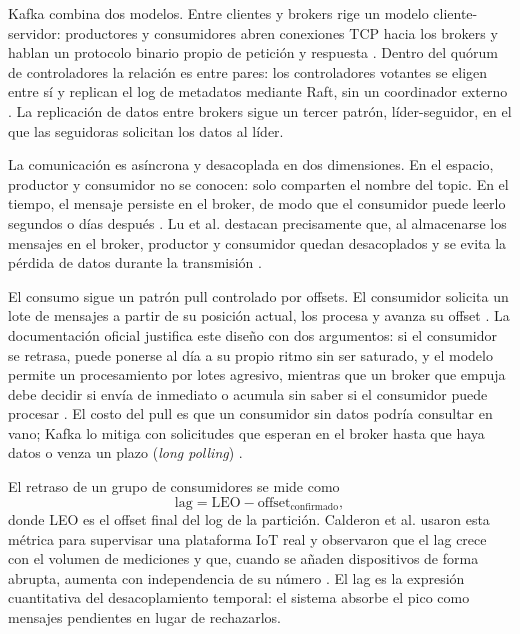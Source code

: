 \documentclass[11pt,a4paper]{article}
\begin{document}
Kafka combina dos modelos. Entre clientes y brokers rige un modelo cliente-servidor: productores y consumidores abren conexiones TCP hacia los brokers y hablan un protocolo binario propio de petición y respuesta \cite{calderon2024monitoring,kafkadocs}. Dentro del quórum de controladores la relación es entre pares: los controladores votantes se eligen entre sí y replican el log de metadatos mediante Raft, sin un coordinador externo \cite{kip500,ongaro2014raft}. La replicación de datos entre brokers sigue un tercer patrón, líder-seguidor, en el que las seguidoras solicitan los datos al líder.

La comunicación es asíncrona y desacoplada en dos dimensiones. En el espacio, productor y consumidor no se conocen: solo comparten el nombre del topic. En el tiempo, el mensaje persiste en el broker, de modo que el consumidor puede leerlo segundos o días después \cite{lu2025proposal}. Lu et al. destacan precisamente que, al almacenarse los mensajes en el broker, productor y consumidor quedan desacoplados y se evita la pérdida de datos durante la transmisión \cite{lu2025proposal}.

El consumo sigue un patrón pull controlado por offsets. El consumidor solicita un lote de mensajes a partir de su posición actual, los procesa y avanza su offset \cite{raptis2023survey}. La documentación oficial justifica este diseño con dos argumentos: si el consumidor se retrasa, puede ponerse al día a su propio ritmo sin ser saturado, y el modelo permite un procesamiento por lotes agresivo, mientras que un broker que empuja debe decidir si envía de inmediato o acumula sin saber si el consumidor puede procesar \cite{kafkadocs}. El costo del pull es que un consumidor sin datos podría consultar en vano; Kafka lo mitiga con solicitudes que esperan en el broker hasta que haya datos o venza un plazo (\emph{long polling}) \cite{kafkadocs}.

El retraso de un grupo de consumidores se mide como
\begin{equation}
\text{lag} = \text{LEO} - \text{offset}_{\text{confirmado}},
\end{equation}
donde LEO es el offset final del log de la partición. Calderon et al. usaron esta métrica para supervisar una plataforma IoT real y observaron que el lag crece con el volumen de mediciones y que, cuando se añaden dispositivos de forma abrupta, aumenta con independencia de su número \cite{calderon2024monitoring}. El lag es la expresión cuantitativa del desacoplamiento temporal: el sistema absorbe el pico como mensajes pendientes en lugar de rechazarlos.
\end{document}
